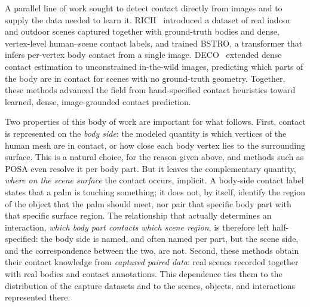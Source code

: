 A parallel line of work sought to detect contact directly from images and to supply the data needed to learn it. RICH~\cite{huang2022rich} introduced a dataset of real indoor and outdoor scenes captured together with ground-truth bodies and dense, vertex-level human--scene contact labels, and trained BSTRO, a transformer that infers per-vertex body contact from a single image. DECO~\cite{tripathi2023deco} extended dense contact estimation to unconstrained in-the-wild images, predicting which parts of the body are in contact for scenes with no ground-truth geometry. Together, these methods advanced the field from hand-specified contact heuristics toward learned, dense, image-grounded contact prediction.

Two properties of this body of work are important for what follows. First, contact is represented on the \emph{body side}: the modeled quantity is which vertices of the human mesh are in contact, or how close each body vertex lies to the surrounding surface. This is a natural choice, for the reason given above, and methods such as POSA even resolve it per body part. But it leaves the complementary quantity, \emph{where on the scene surface} the contact occurs, implicit. A body-side contact label states that a palm is touching something; it does not, by itself, identify the region of the object that the palm should meet, nor pair that specific body part with that specific surface region. The relationship that actually determines an interaction, \emph{which body part contacts which scene region}, is therefore left half-specified: the body side is named, and often named per part, but the scene side, and the correspondence between the two, are not. Second, these methods obtain their contact knowledge from \emph{captured paired data}: real scenes recorded together with real bodies and contact annotations. This dependence ties them to the distribution of the capture datasets and to the scenes, objects, and interactions represented there.

